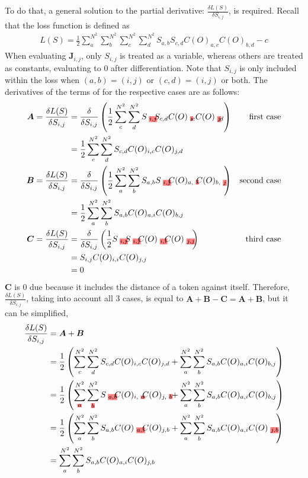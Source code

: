 To do that, a general solution to the partial derivative: $ \frac{\delta L(S)}{\delta S_{i,j}}$, is required. Recall that the loss function is defined as
\begin{align}
    L(S)=\frac{1}{2}\sum_{a}^{N^2} \sum_{b}^{N^2} \sum_{c}^{N^2} \sum_{d}^{N^2} S_{a,b} S_{c,d} C(O)_{a,c}C(O)_{b,d}-c
\end{align}
When evaluating $\bm{J}_{i,j}$, only $S_{i,j}$ is treated as a variable, whereas others are treated as constants, evaluating to $0$ after differentiation. Note that $S_{i,j}$ is only included within the loss when $(a,b)=(i,j)$ or $(c,d)=(i,j)$ or both. The derivatives of the terms of for the respective cases are as follows:
\begin{align}
    \bm{A}=\frac{\delta L(S)}{\delta S_{i,j}}&=\frac{\delta}{\delta S_{i,j}}\left(\frac{1}{2}\sum_{c}^{N^2} \sum_{d}^{N^2} S_{\highlight{i,j}} S_{c,d} C(O)_{\highlight{i},c}C(O)_{\highlight{j},d}\right)&\text{first case}\nonumber\\
              &=\frac{1}{2}\sum_{c}^{N^2} \sum_{d}^{N^2} S_{c,d} C(O)_{i,c}C(O)_{j,d}&\nonumber\\
    \bm{B}=\frac{\delta L(S)}{\delta S_{i,j}}&=\frac{\delta}{\delta S_{i,j}}\left(\frac{1}{2}\sum_{a}^{N^2} \sum_{b}^{N^2} S_{a,b} S_{\highlight{i,j}} C(O)_{a,\highlight{i}}C(O)_{b,\highlight{j}}\right)&\text{second case}\nonumber\\
              &=\frac{1}{2}\sum_{a}^{N^2} \sum_{b}^{N^2} S_{a,b} C(O)_{a,i}C(O)_{b,j}&\nonumber\\
    \bm{C}=\frac{\delta L(S)}{\delta S_{i,j}}&=\frac{\delta}{\delta S_{i,j}}\left(\frac{1}{2}S_{\highlight{i,j}} S_{\highlight{i,j}} C(O)_{\highlight{i,i}}C(O)_{\highlight{j,j}}\right)&\text{third case}\nonumber\\
              &=S_{i,j} C(O)_{i,i}C(O)_{j,j}&\nonumber\\
              &=0&
\end{align}
$\bm{C}$ is $0$ due because it includes the distance of a token against itself. Therefore, $\frac{\delta L(S)}{\delta S_{i,j}}$, taking into account all 3 cases, is equal to $\bm{A}+\bm{B}-\bm{C}=\bm{A}+\bm{B}$, but it can be simplified,
\begin{align}
    \frac{\delta L(S)}{\delta S_{i,j}}&=\bm{A}+\bm{B}\nonumber\\
    &=\frac{1}{2}\left(\sum_{c}^{N^2} \sum_{d}^{N^2} S_{c,d} C(O)_{i,c}C(O)_{j,d}+\sum_{a}^{N^2} \sum_{b}^{N^2} S_{a,b} C(O)_{a,i}C(O)_{b,j}\right)\nonumber\\
    &=\frac{1}{2}\left(\sum_{\highlight{a}}^{N^2} \sum_{\highlight{b}}^{N^2} S_{\highlight{a,b}} C(O)_{i,\highlight{a}}C(O)_{j,\highlight{b}}+\sum_{a}^{N^2} \sum_{b}^{N^2} S_{a,b} C(O)_{a,i}C(O)_{b,j}\right)\label{eq:simplification_1}\\
    &=\frac{1}{2}\left(\sum_{a}^{N^2} \sum_{b}^{N^2} S_{a,b} C(O)_{\highlight{a,i}}C(O)_{j,b}+\sum_{a}^{N^2} \sum_{b}^{N^2} S_{a,b} C(O)_{a,i}C(O)_{\highlight{j,b}}\right)\label{eq:simplification_2}\\
    &=\sum_{a}^{N^2} \sum_{b}^{N^2} S_{a,b} C(O)_{a,i}C(O)_{j,b}
\end{align}
